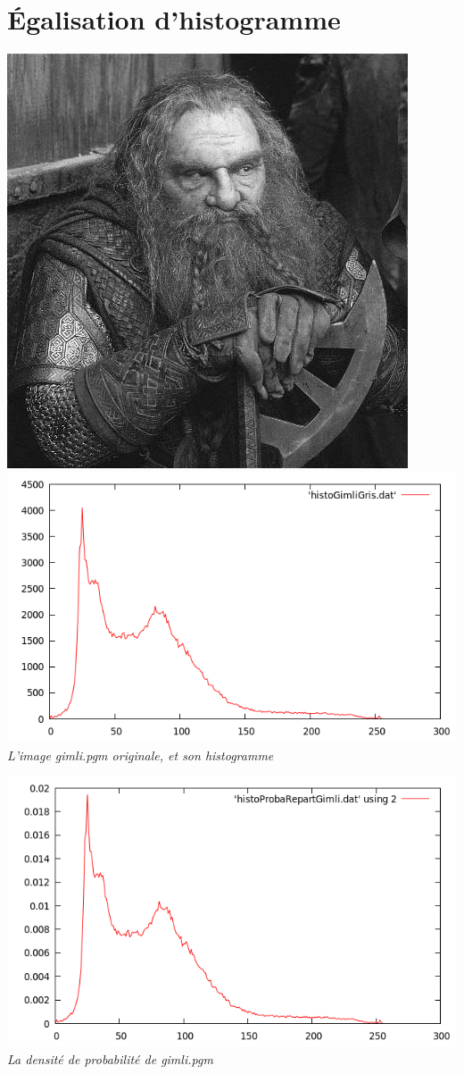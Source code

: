 \documentclass[a4paper,11pt]{article}
\begin{document}
\section{Égalisation d'histogramme}
\begin{center}
\includegraphics[scale=0.5]{gimli_pgm.png}
\includegraphics[scale=0.5]{histoGimliGris.png}\\
\textit{L'image gimli.pgm originale, et son histogramme}
\end{center}
\newpage
\begin{center}
\includegraphics[scale=0.5]{ddpGimliGris.png}\\
\textit{La densité de probabilité de gimli.pgm}
\end{center}
\end{document}
